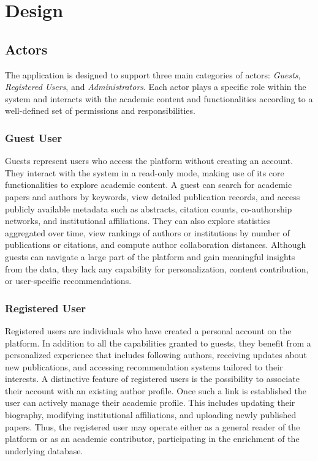 \chapter{Design}

\section{Actors}

The application is designed to support three main categories of actors: \textit{Guests}, \textit{Registered Users}, and \textit{Administrators}. Each actor plays a specific role within the system and interacts with the academic content and functionalities according to a well-defined set of permissions and responsibilities.

\subsection{Guest User}
Guests represent users who access the platform without creating an account. They interact with the system in a read-only mode, making use of its core functionalities to explore academic content. A guest can search for academic papers and authors by keywords, view detailed publication records, and access publicly available metadata such as abstracts, citation counts, co-authorship networks, and institutional affiliations. They can also explore statistics aggregated over time, view rankings of authors or institutions by number of publications or citations, and compute author collaboration distances. Although guests can navigate a large part of the platform and gain meaningful insights from the data, they lack any capability for personalization, content contribution, or user-specific recommendations.

\subsection{Registered User}
Registered users are individuals who have created a personal account on the platform. In addition to all the capabilities granted to guests, they benefit from a personalized experience that includes following authors, receiving updates about new publications, and accessing recommendation systems tailored to their interests. A distinctive feature of registered users is the possibility to associate their account with an existing author profile. Once such a link is established the user can actively manage their academic profile. This includes updating their biography, modifying institutional affiliations, and uploading newly published papers. Thus, the registered user may operate either as a general reader of the platform or as an academic contributor, participating in the enrichment of the underlying database.

